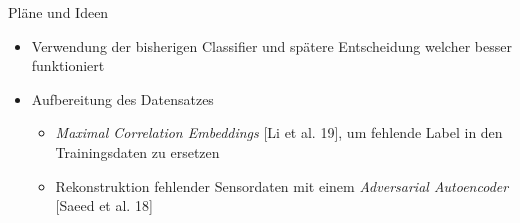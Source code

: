 \documentclass[10pt,%
	wide,%
	xcolor={x11names},%
	hyperref={colorlinks},%
	pantone312,%
	handout,%
	]{beamer}
\begin{document}
\begin{frame}[t]{Pläne und Ideen}
	\begin{itemize}
		\item Verwendung der bisherigen Classifier und spätere Entscheidung welcher besser funktioniert
		\item Aufbereitung des Datensatzes
		\begin{itemize}
			\item \emph{Maximal Correlation Embeddings} [Li et al. 19], um fehlende Label in den Trainingsdaten zu ersetzen
			\item Rekonstruktion fehlender Sensordaten mit einem \emph{Adversarial Autoencoder} [Saeed et al. 18]
		\end{itemize}
	\end{itemize}
\end{frame}
\end{document}
